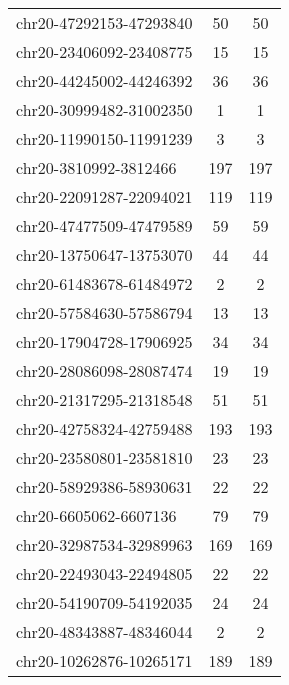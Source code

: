 \begin{longtable}{lSS}
	chr20-47292153-47293840 & 50     & 50                                  \\
	chr20-23406092-23408775 & 15     & 15                                  \\
	chr20-44245002-44246392 & 36     & 36                                  \\
	chr20-30999482-31002350 & 1      & 1                                   \\
	chr20-11990150-11991239 & 3      & 3                                   \\
	chr20-3810992-3812466   & 197    & 197                                 \\
	chr20-22091287-22094021 & 119    & 119                                 \\
	chr20-47477509-47479589 & 59     & 59                                  \\
	chr20-13750647-13753070 & 44     & 44                                  \\
	chr20-61483678-61484972 & 2      & 2                                   \\
	chr20-57584630-57586794 & 13     & 13                                  \\
	chr20-17904728-17906925 & 34     & 34                                  \\
	chr20-28086098-28087474 & 19     & 19                                  \\
	chr20-21317295-21318548 & 51     & 51                                  \\
	chr20-42758324-42759488 & 193    & 193                                 \\
	chr20-23580801-23581810 & 23     & 23                                  \\
	chr20-58929386-58930631 & 22     & 22                                  \\
	chr20-6605062-6607136   & 79     & 79                                  \\
	chr20-32987534-32989963 & 169    & 169                                 \\
	chr20-22493043-22494805 & 22     & 22                                  \\
	chr20-54190709-54192035 & 24     & 24                                  \\
	chr20-48343887-48346044 & 2      & 2                                   \\
	chr20-10262876-10265171 & 189    & 189                                 \\

\end{longtable}
